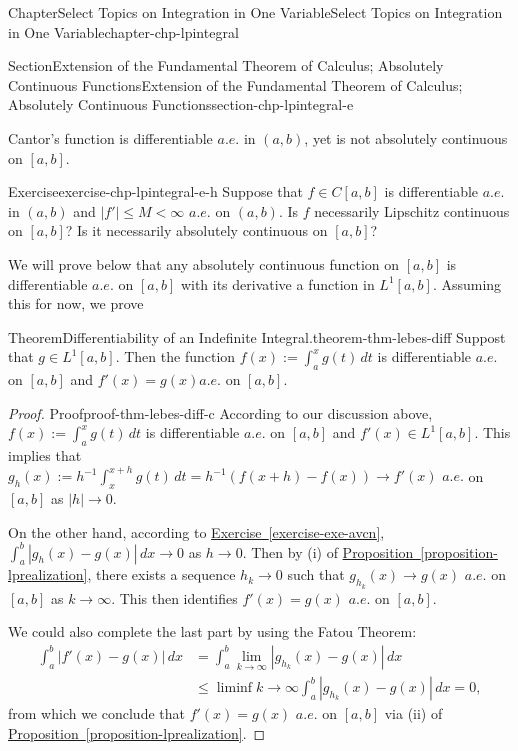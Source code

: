 \documentclass[oneside,10pt,]{book}
\newcommand{\xreffont}{\relax}
\numberwithin{equation}{section}
\newcommand{\amp}{&}
\begin{document}
\begin{chapterptx}{Chapter}{Select Topics on Integration in One Variable}{}{Select Topics on Integration in One Variable}{}{}{chapter-chp-lpintegral}
\begin{sectionptx}{Section}{Extension of the Fundamental Theorem of Calculus; Absolutely Continuous Functions}{}{Extension of the Fundamental Theorem of Calculus; Absolutely Continuous Functions}{}{}{section-chp-lpintegral-e}
\par
Cantor's function is differentiable \(a.e.\) in \((a, b)\), yet is not absolutely continuous on \([a, b]\).%
\begin{inlineexercise}{Exercise}{}{exercise-chp-lpintegral-e-h}%
Suppose that  \(f\in C[a, b]\) is differentiable \(a.e.\) in \((a, b)\) and \(|f'|\le M < \infty\) \(a.e.\) on \((a, b)\). Is \(f\) necessarily Lipschitz continuous on \([a, b]\)? Is it necessarily absolutely continuous on \([a, b]\)?%
\end{inlineexercise}%
We will prove below that any absolutely continuous function on \([a, b]\) is differentiable \(a.e.\) on \([a, b]\) with its derivative a function in \(L^{1}[a, b]\). Assuming this for now, we prove%
\begin{theorem}{Theorem}{Differentiability of an Indefinite Integral.}{}{theorem-thm-lebes-diff}%
Suppost that \(g\in L^{1}[a, b]\). Then the function \(f(x) :=\int_{a}^{x} g(t)\, dt\) is differentiable \(a.e.\) on \([a, b]\) and \(f'(x)=g(x)\)\(a.e.\) on \([a, b]\).\end{theorem}
\begin{proof}{Proof}{}{proof-thm-lebes-diff-c}
According to our discussion above, \(f(x) :=\int_{a}^{x} g(t)\, dt\) is differentiable \(a.e.\) on \([a, b]\) and \(f'(x)\in L^{1}[a, b]\). This implies that \(g_{h}(x) := h^{-1}\int_{x}^{x+h} g(t)\, dt =h^{-1}(f(x+h)-f(x)) \to f'(x)\) \(a.e.\) on \([a, b]\) as \(|h|\to 0\).%
\par
On the other hand, according to \hyperref[exercise-exe-avcn]{Exercise~{\xreffont\ref{exercise-exe-avcn}}}, \(\int_{a}^{b}|g_{h}(x)-g(x)|\, dx\to 0\) as \(h\to 0\). Then by (i) of \hyperref[proposition-lprealization]{Proposition~{\xreffont\ref{proposition-lprealization}}},  there exists a sequence \(h_{k}\to 0\) such that \(g_{h_{k}}(x)\to g(x)\) \(a.e.\) on \([a, b]\) as \(k\to \infty\). This then identifies \(f'(x)=g(x)\) \(a.e.\) on \([a, b]\).%
\par
We could also complete the last part by using the Fatou Theorem:%
\begin{align*}
\int_{a}^{b} |f'(x)-g(x)|\, dx \amp= \int_{a}^{b} \lim_{k\to \infty }|g_{h_{k}}(x)-g(x)|\, dx \\
\amp \le \liminf{k\to \infty}  \int_{a}^{b} |g_{h_{k}}(x)-g(x)|\, dx=0,
\end{align*}
from which we conclude that \(f'(x)=g(x)\) \(a.e.\) on \([a, b]\) via (ii) of \hyperref[proposition-lprealization]{Proposition~{\xreffont\ref{proposition-lprealization}}}.%
\end{proof}

\end{sectionptx}
\end{chapterptx}
\end{document}
